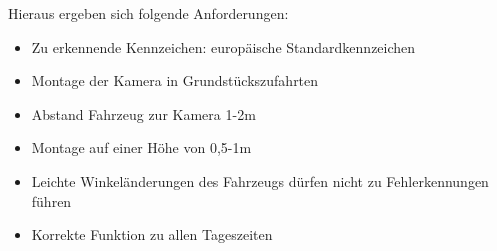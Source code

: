 \documentclass{../Vorlage/sebDenCls}
\begin{document}
Hieraus ergeben sich folgende Anforderungen:
\begin{itemize}
\item Zu erkennende Kennzeichen: europäische Standardkennzeichen
\item Montage der Kamera in Grundstückszufahrten
\item Abstand Fahrzeug zur Kamera 1-2m
\item Montage auf einer Höhe von 0,5-1m
\item Leichte Winkeländerungen des Fahrzeugs dürfen nicht zu Fehlerkennungen führen
\item Korrekte Funktion zu allen Tageszeiten
\end{itemize}	


\section{}
\end{document}
